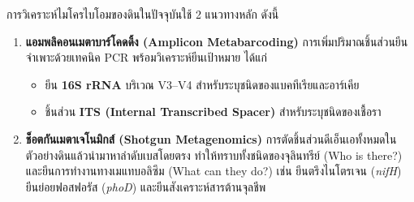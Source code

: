 การวิเคราะห์ไมโครไบโอมของดินในปัจจุบันใช้ 2 แนวทางหลัก ดังนี้
\begin{enumerate}
    \item \textbf{แอมพลิคอนเมตาบาร์โคดดิ้ง (Amplicon Metabarcoding)} การเพิ่มปริมาณชิ้นส่วนยีนจำเพาะด้วยเทคนิค PCR พร้อมวิเคราะห์ยีนเป้าหมาย ได้แก่
    \begin{itemize}
        \item ยีน \textbf{16S rRNA} บริเวณ V3--V4 สำหรับระบุชนิดของแบคทีเรียและอาร์เคีย
        \item ชิ้นส่วน \textbf{ITS (Internal Transcribed Spacer)} สำหรับระบุชนิดของเชื้อรา
    \end{itemize}
    \item \textbf{ช็อตกันเมตาเจโนมิกส์ (Shotgun Metagenomics)} การตัดชิ้นส่วนดีเอ็นเอทั้งหมดในตัวอย่างดินแล้วนำมาหาลำดับเบสโดยตรง ทำให้ทราบทั้งชนิดของจุลินทรีย์ (Who is there?) และยีนการทำงานทางเมแทบอลิซึม (What can they do?) เช่น ยีนตรึงไนโตรเจน (\textit{nifH}) ยีนย่อยฟอสฟอรัส (\textit{phoD}) และยีนสังเคราะห์สารต้านจุลชีพ
\end{enumerate}

